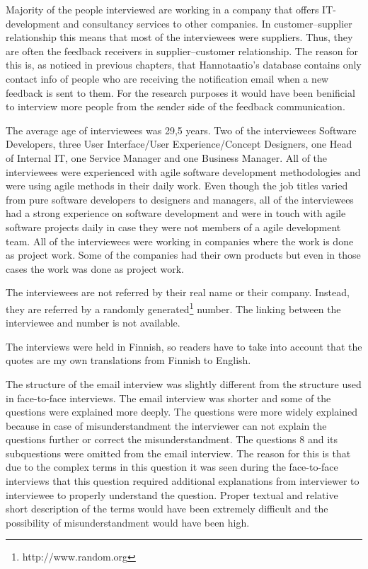 \documentclass[english,12pt,a4paper,pdftex]{article}
\begin{document}
Majority of the people interviewed are working in a company that offers IT-development and consultancy services to other companies. In customer--supplier relationship this means that most of the interviewees were suppliers. Thus, they are often the feedback receivers in supplier--customer relationship. The reason for this is, as noticed in previous chapters, that Hannotaatio's database contains only contact info of people who are receiving the notification email when a new feedback is sent to them. For the research purposes it would have been benificial to interview more people from the sender side of the feedback communication.

The average age of interviewees was 29,5 years. Two of the interviewees Software Developers, three User Interface/User Experience/Concept Designers, one Head of Internal IT, one Service Manager and one Business Manager. All of the interviewees were experienced with agile software development methodologies and were using agile methods in their daily work. Even though the job titles varied from pure software developers to designers and managers, all of the interviewees had a strong experience on software development and were in touch with agile software projects daily in case they were not members of a agile development team. All of the interviewees were working in companies where the work is done as project work. Some of the companies had their own products but even in those cases the work was done as project work.

The interviewees are not referred by their real name or their company. Instead, they are referred by a randomly generated\footnote{http://www.random.org} number. The linking between the interviewee and number is not available.

The interviews were held in Finnish, so readers have to take into account that the quotes are my own translations from Finnish to English.

The structure of the email interview was slightly different from the structure used in face-to-face interviews. The email interview was shorter and some of the questions were explained more deeply. The questions were more widely explained because in case of misunderstandment the interviewer can not explain the questions further or correct the misunderstandment. The questions 8 and its subquestions were omitted from the email interview. The reason for this is that due to the complex terms in this question it was seen during the face-to-face interviews that this question required additional explanations from interviewer to interviewee to properly understand the question. Proper textual and relative short description of the terms would have been extremely difficult and the possibility of misunderstandment would have been high. 
\end{document}
